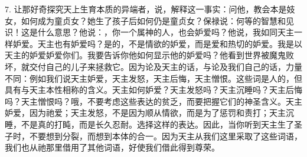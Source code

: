 7. 让那好奇探究天上生育本质的异端者，说，解释这一事实：问他，教会本是妓女，如何成为童贞女？她生了孩子后如何仍是童贞女？保禄说：何等的智慧和见识！这是什么意思？他说：，你一个属神的人，也会妒爱吗？他说，我如同天主一样妒爱。天主也有妒爱吗？是的，不是情欲的妒爱，而是爱和热切的妒爱。我是以天主的妒爱妒爱你们。我要告诉你他如何显示他的妒爱吗？他看到世界被魔鬼败坏，就交付自己的儿子来拯救它。因为论及天主的话，与论及我们自己的话，力量不同：例如我们说天主妒爱，天主发怒，天主后悔，天主憎恨。这些词是人的，但具有与天主本性相称的含义。天主如何妒爱？天主发怒吗？天主沉睡吗？天主后悔吗？天主憎恨吗？哦，不要考虑这些表达的贫乏，而要把握它们的神圣含义。天主妒爱，因为祂爱；天主发怒，不是因为顺从情欲，而是为了惩罚和责打；天主沉睡，不是真的打盹，而是长久忍耐。选择这样的表达。因此，当你听到天主生了圣子时，不要想到分裂，而想到本体的合一。因为天主从我们这里采取了这些词语，我们也从祂那里借用了其他词语，好使我们借此得到尊荣。\par

